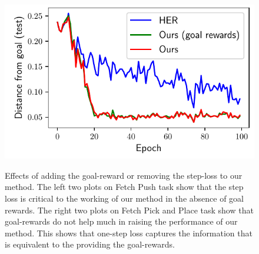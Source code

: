 \begin{figure}
  \includegraphics[width=\frac\columnwidth]{media/res/ablate-ours-with-goal-reward/FetchPickAndPlace-dqstepoch-test/ag_g_dist.pdf}%
  \label{fig:with-and-without-step-loss}%
  \caption{
    Effects of adding the goal-reward or removing the step-loss to our method.
    The left two plots on Fetch Push task show that the step loss is critical to the working of our
    method in the absence of goal rewards.
    The right two plots on Fetch Pick and Place task show that goal-rewards do not help much in raising the
    performance of our method. This shows that one-step loss captures the
    information that is equivalent to the providing the goal-rewards.}
\end{figure}%
% 

